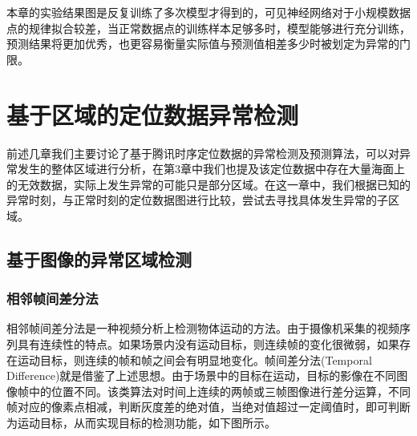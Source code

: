 \documentclass[a4paper,AutoFakeBold,oneside,12pt]{book}
\begin{document}

	本章的实验结果图是反复训练了多次模型才得到的，可见神经网络对于小规模数据点的规律拟合较差，当正常数据点的训练样本足够多时，模型能够进行充分训练，预测结果将更加优秀，也更容易衡量实际值与预测值相差多少时被划定为异常的门限。

\chapter{基于区域的定位数据异常检测}
	前述几章我们主要讨论了基于腾讯时序定位数据的异常检测及预测算法，可以对异常发生的整体区域进行分析，在第3章中我们也提及该定位数据中存在大量海面上的无效数据，实际上发生异常的可能只是部分区域。在这一章中，我们根据已知的异常时刻，与正常时刻的定位数据图进行比较，尝试去寻找具体发生异常的子区域。

\section{基于图像的异常区域检测}
\subsection{相邻帧间差分法}
	相邻帧间差分法是一种视频分析上检测物体运动的方法。由于摄像机采集的视频序列具有连续性的特点。如果场景内没有运动目标，则连续帧的变化很微弱，如果存在运动目标，则连续的帧和帧之间会有明显地变化。帧间差分法(Temporal Difference)就是借鉴了上述思想。由于场景中的目标在运动，目标的影像在不同图像帧中的位置不同。该类算法对时间上连续的两帧或三帧图像进行差分运算，不同帧对应的像素点相减，判断灰度差的绝对值，当绝对值超过一定阈值时，即可判断为运动目标，从而实现目标的检测功能，如下图所示。
\end{document}

